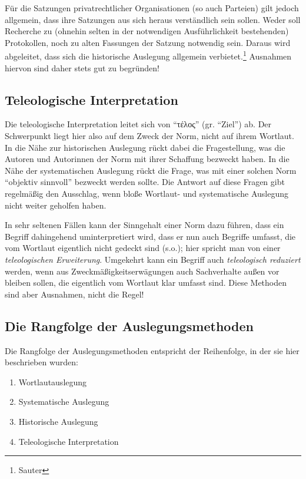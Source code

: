 Für die Satzungen privatrechtlicher Organisationen (so auch Parteien) gilt jedoch allgemein, dass ihre Satzungen aus sich heraus verständlich sein sollen. Weder soll Recherche zu (ohnehin selten in der notwendigen Ausführlichkeit bestehenden) Protokollen, noch zu alten Fassungen der Satzung notwendig sein. Daraus wird abgeleitet, dass sich die historische Auslegung allgemein verbietet.\footnote{Sauter} Ausnahmen hiervon sind daher stets gut zu begründen!

\subsection{Teleologische Interpretation}
Die teleologische Interpretation leitet sich von \enquote{τέλος} (gr. \enquote{Ziel}) ab. Der Schwerpunkt liegt hier also auf dem Zweck der Norm, nicht auf ihrem Wortlaut. In die Nähe zur historischen Auslegung rückt dabei die Fragestellung, was die Autoren und Autorinnen der Norm mit ihrer Schaffung bezweckt haben. In die Nähe der systematischen Auslegung rückt die Frage, was mit einer solchen Norm \enquote{objektiv sinnvoll} bezweckt werden sollte. Die Antwort auf diese Fragen gibt regelmäßig den Ausschlag, wenn bloße Wortlaut- und systematische Auslegung nicht weiter geholfen haben.

In sehr seltenen Fällen kann der Sinngehalt einer Norm dazu führen, dass ein Begriff dahingehend uminterpretiert wird, dass er nun auch Begriffe umfasst, die vom Wortlaut eigentlich nicht gedeckt sind (s.o.); hier spricht man von einer \emph{teleologischen Erweiterung}. Umgekehrt kann ein Begriff auch \emph{teleologisch reduziert} werden, wenn aus Zweckmäßigkeitserwägungen auch Sachverhalte außen vor bleiben sollen, die eigentlich vom Wortlaut klar umfasst sind. Diese Methoden sind aber Ausnahmen, nicht die Regel!

\subsection{Die Rangfolge der Auslegungsmethoden}
Die Rangfolge der Auslegungsmethoden entspricht der Reihenfolge, in der sie hier beschrieben wurden:
\begin{enumerate}
\item Wortlautauslegung
\item Systematische Auslegung
\item Historische Auslegung
\item Teleologische Interpretation
\end{enumerate}

